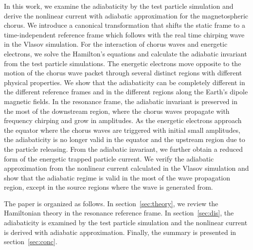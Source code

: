 In this work, we examine the adiabaticity by the test particle simulation and derive the nonlinear current with adiabatic approximation for 
the magnetospheric chorus.
We introduce a canonical transformation that shifts the static frame to a time-independent reference frame which follows with the real time chirping wave in the Vlasov simulation.
For the interaction of chorus waves and energetic electrons,
we solve the Hamilton's equations and calculate the adiabatic invariant from the test particle simulations.
The energetic electrons move opposite to the motion of the chorus wave packet through several distinct regions with different physical properties.
We show that the adiabaticity can be completely different in the different reference frames and in the different regions  along the Earth's dipole magnetic fields. 
In the resonance frame,  the adiabatic invariant is preserved in the most of the  downstream region, where the   chorus waves  propagate with frequency chirping and grow in amplitudes.
As the energetic electrons approach the equator
where the chorus waves are triggered with initial small amplitudes,
the adiabaticity  is no longer valid in the equator and the upstream region  due to the particle releasing.
From the adiabatic invariant, we further obtain a reduced  form of the energetic trapped particle current.
We verify the adiabatic approximation from the nonlinear current calculated in the Vlasov simulation and show that the adiabatic regime is valid in the most of the wave propagation region, except in the source regions where the wave is generated from.

The paper is organized as follows. In section~\ref{sec:theory}, we review the Hamiltonian theory in the resonance reference frame. In section~\ref{sec:dis},  
the adiabaticity 
is examined by the test particle simulation and  the nonlinear current 
is derived with adiabatic approximation. Finally, the summary is presented in section~\ref{sec:conc}.
